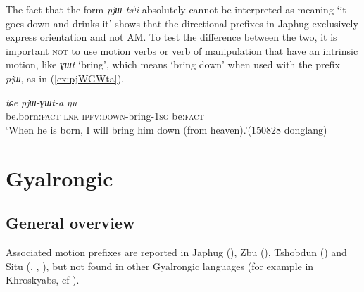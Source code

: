 \documentclass[oneside,a4paper,11pt]{article}
\newcommand{\ipa}[1]{{\phon\textit{#1}}}
\begin{document}
The fact that the form \ipa{pjɯ-tsʰi} absolutely cannot be interpreted as meaning `it goes down and drinks it' shows that the directional prefixes in Japhug exclusively express orientation and not AM. To test the difference between the two, it is important \textsc{not} to use motion verbs or verb of manipulation that have an intrinsic motion, like  \ipa{ɣɯt} `bring', which means `bring down' when used with the prefix \ipa{pjɯ}, as in (\ref{ex:pjWGWta}).

\begin{exe}
\ex \label{ex:pjWGWta}
 \gll \ipa{sci} 	\ipa{tɕe} 	\ipa{pjɯ-ɣɯt-a} 	\ipa{ŋu}  \\
 be.born:\textsc{fact}  \textsc{lnk} \textsc{ipfv}:\textsc{down}-bring-\textsc{1sg} be:\textsc{fact} \\
\glt `When he is born, I will bring him down (from heaven).'(150828 donglang)
\end{exe}
 
  
\section{Gyalrongic}

\subsection{General overview}
Associated motion prefixes are reported in Japhug (\citealt{jacques13harmonization}), Zbu (\citealt{gong18these}), Tshobdun (\citealt{jackson14morpho}) and Situ (\citealt[200-204]{zhang16bragdbar}, \citealt[497-500]{prins16kyomkyo}, \citealt{linyj17space}), but not found in other Gyalrongic languages (for example in Khroskyabs, cf \citealt{lai17khroskyabs}).
 
%
%
\end{document}
